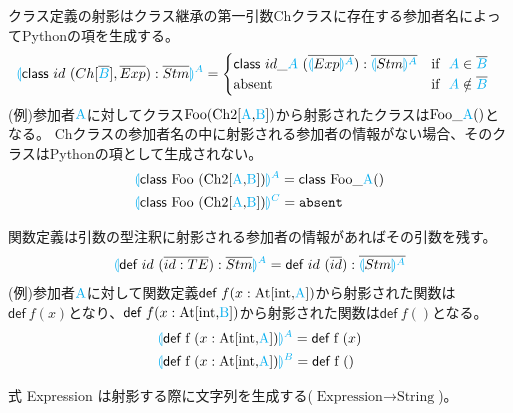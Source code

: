 \documentclass{thesis}
\newcommand{\projection}[2]{{\color{cyan}\llparenthesis}#1{\color{cyan}\rrparenthesis^#2}}
\newcommand{\cyan}[1]{\color{cyan}#1}
\begin{document}
クラス定義の射影はクラス継承の第一引数Chクラスに存在する参加者名によってPythonの項を生成する。
\begin{alignat*}{2} 
  &\projection{\textsf{class} ~id~(Ch[\overline{\cyan{B}}],\overline{Exp}):\overline{Stm}}{A}=
  \begin{cases}
    \textsf{class} ~id\_{\cyan{A}}~(\overline{\projection{Exp}{A}}):\overline{\projection{Stm}{A}} & \text{if}~~ {\cyan{A}} \in \overline{\cyan{B}}\\
    \text{absent} & \text{if}~~ {\cyan{A}} \notin \overline{\cyan{B}}
  \end{cases}
\end{alignat*}
(例)参加者$\cyan{\text{A}}$に対してクラス$\text{Foo(Ch2[{\cyan{A}},{\cyan{B}}])}$から射影されたクラスは$\text{Foo\_{\cyan{A}}}()$となる。
Chクラスの参加者名の中に射影される参加者の情報がない場合、そのクラスはPythonの項として生成されない。
\begin{alignat*}{2} 
  &\projection{\textsf{class} ~\text{Foo}~ \text{(Ch2[{\cyan{A}},{\cyan{B}}])}}{A} = \textsf{class} ~\text{Foo\_{\cyan{A}}}()\\
  &\projection{\textsf{class} ~\text{Foo}~ \text{(Ch2[{\cyan{A}},{\cyan{B}}])}}{C} = \texttt{absent} 
\end{alignat*}

関数定義は引数の型注釈に射影される参加者の情報があればその引数を残す。
\begin{alignat*}{2} 
  &\projection{\textsf{def} ~id~(\overline{id:TE}):\overline{Stm}}{A} = \textsf{def} ~id~ (\overline{id}):\overline{\projection{Stm}{A}}\\
\end{alignat*}
(例)参加者$\cyan{\text{A}}$に対して関数定義$\textsf{def}~f(x:\text{At[int,{\cyan{A}}]})$から射影された関数は$\textsf{def}~f(x)$となり、$\textsf{def}~f(x:\text{At[int,{\cyan{B}}]})$から射影された関数は$\textsf{def}~f()$となる。
\begin{alignat*}{2} 
  &\projection{\textsf{def} ~\text{f}~(x:\text{At[int,{\cyan{A}}]})}{A} = \textsf{def} ~\text{f}~ (x)\\
  &\projection{\textsf{def} ~\text{f}~(x:\text{At[int,{\cyan{A}}]})}{B} = \textsf{def} ~\text{f}~ ()\\
\end{alignat*}

式 Expression は射影する際に文字列を生成する($\text{Expression} \rightarrow \text{String}$)。
\end{document}
